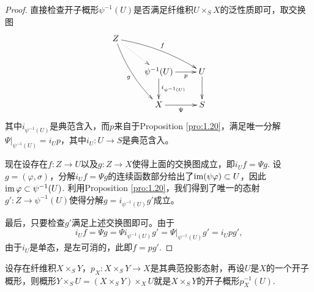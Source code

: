 \begin{proof}
直接检查开子概形$\psi^{-1}(U)$是否满足纤维积$U\times_S X$的泛性质即可，取交换图
\[
\begin{xy}
	\xymatrix{
		Z\ar@/_/[rdd]_{g}\ar@/^/[drr]^{f}\ar@{.>}[dr]&&\\
		&\psi^{-1}(U)\ar[r]_-{p}\ar[d]^{i_{\psi^{-1}(U)}}&U\ar[d]\\
		&X\ar[r]_-\Psi & S
	}
\end{xy}
\]
其中$i_{\psi^{-1}(U)}$是典范含入，而$p$来自于Proposition \ref{pro:1.20}，满足唯一分解$\Psi|_{\psi^{-1}(U)}=i_Up$，其中$i_U:U\to S$是典范含入。

现在设存在$f:Z\to U$以及$g:Z\to X$使得上面的交换图成立，即$i_U f=\Psi g$. 设$g=(\varphi,\sigma)$，分解$i_U f=\Psi g$的连续函数部分给出了$\operatorname{im}(\psi\varphi)\subset U$，因此$\operatorname{im} \varphi\subset \psi^{-1}(U)$. 利用Proposition \ref{pro:1.20}，我们得到了唯一的态射$g':Z\to\psi^{-1}(U)$使得分解$g=i_{\psi^{-1}(U)}g'$成立。

最后，只要检查$g'$满足上述交换图即可。由于
\[
	i_U f = \Psi g = \Psi i_{\psi^{-1}(U)}g'=\Psi|_{\psi^{-1}(U)}g'=i_Upg',
\]
由于$i_U$是单态，是左可消的，此即$f=pg'$.
\end{proof}

\begin{coro}
设存在纤维积$X\times_S Y$，$p_X:X\times_S Y\to X$是其典范投影态射，再设$U$是$X$的一个开子概形，则概形$Y\times_S U=(X\times_S Y)\times_X U$就是$X\times_S Y$的开子概形$p_X^{-1}(U)$.
\end{coro}



